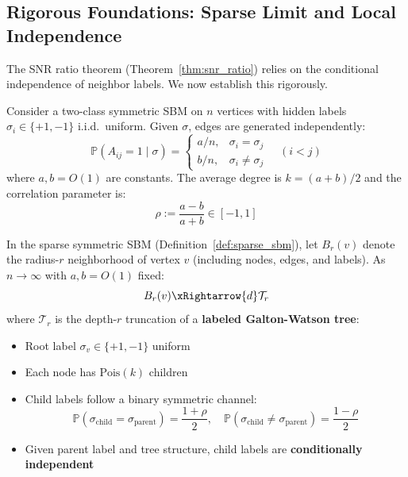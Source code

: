 
\subsection{Rigorous Foundations: Sparse Limit and Local Independence}
\label{subsec:sparse_limit}

The SNR ratio theorem (Theorem~\ref{thm:snr_ratio}) relies on the conditional independence of neighbor labels. We now establish this rigorously.

\begin{definition}
\label{def:sparse_sbm}
Consider a two-class symmetric SBM on $n$ vertices with hidden labels $\sigma_i \in \{+1, -1\}$ i.i.d.\ uniform. Given $\sigma$, edges are generated independently:
\begin{equation}
    \mathbb{P}(A_{ij} = 1 \mid \sigma) =
    \begin{cases}
        a/n, & \sigma_i = \sigma_j \\
        b/n, & \sigma_i \neq \sigma_j
    \end{cases}
    \quad (i < j)
\end{equation}
where $a, b = O(1)$ are constants. The average degree is $k = (a+b)/2$ and the correlation parameter is:
\begin{equation}
    \rho := \frac{a - b}{a + b} \in [-1, 1]
\end{equation}
\end{definition}

\begin{lemma}
\label{lem:local_independence}
In the sparse symmetric SBM (Definition~\ref{def:sparse_sbm}), let $B_r(v)$ denote the radius-$r$ neighborhood of vertex $v$ (including nodes, edges, and labels). As $n \to \infty$ with $a, b = O(1)$ fixed:
\begin{equation}
    B_r(v) \xRightarrow{d} \mathcal{T}_r
\end{equation}
where $\mathcal{T}_r$ is the depth-$r$ truncation of a \textbf{labeled Galton-Watson tree}:
\begin{itemize}
    \item Root label $\sigma_v \in \{+1, -1\}$ uniform
    \item Each node has $\mathrm{Pois}(k)$ children
    \item Child labels follow a binary symmetric channel:
    \begin{equation}
        \mathbb{P}(\sigma_{\mathrm{child}} = \sigma_{\mathrm{parent}}) = \frac{1+\rho}{2}, \quad
        \mathbb{P}(\sigma_{\mathrm{child}} \neq \sigma_{\mathrm{parent}}) = \frac{1-\rho}{2}
    \end{equation}
    \item Given parent label and tree structure, child labels are \textbf{conditionally independent}
\end{itemize}
\end{lemma}

